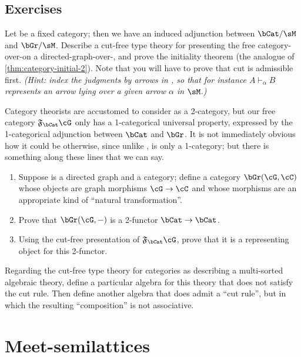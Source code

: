 \documentclass{book}
\let\types\vdash
\newcommand{\F}[1]{\mathfrak{F}_{#1}}
\begin{document}
\subsection*{Exercises}

\begin{ex}\label{ex:categories-over}
  Let \sM be a fixed category; then we have an induced adjunction between $\bCat/\sM$ and $\bGr/\sM$.
  Describe a cut-free type theory for presenting the free category-over-\sM on a directed-graph-over-\sM, and prove the initiality theorem (the analogue of \cref{thm:category-initial-2}).
  Note that you will have to prove that cut is admissible first.
  \textit{(Hint: index the judgments by arrows in \sM, so that for instance $A\types_\alpha B$ represents an arrow lying over a given arrow $\alpha$ in $\sM$.)}
\end{ex}

\begin{ex}\label{ex:cat-2free}
  Category theorists are accustomed to consider \bCat as a 2-category, but our free category $\F\bCat\cG$ only has a 1-categorical universal property, expressed by the 1-categorical adjunction between $\bCat$ and $\bGr$.
  It is not immediately obvious how it could be otherwise, since unlike \bCat, \bGr is only a 1-category; but there is something along these lines that we can say.
  \begin{enumerate}
  \item Suppose \cG is a directed graph and \cC a category; define a category $\bGr(\cG,\cC)$ whose objects are graph morphisms $\cG\to\cC$ and whose morphisms are an appropriate kind of ``natural transformation''.
  \item Prove that $\bGr(\cG,-)$ is a 2-functor $\bCat\to\bCat$.
  \item Using the cut-free presentation of $\F\bCat\cG$, prove that it is a representing object for this 2-functor.
  \end{enumerate}
\end{ex}

\begin{ex}\label{ex:nonfree-noadm}
  Regarding the cut-free type theory for categories as describing a multi-sorted algebraic theory, define a particular algebra for this theory that does not satisfy the cut rule.
  Then define another algebra that does admit a ``cut rule'', but in which the resulting ``composition'' is not associative.
\end{ex}


\section{Meet-semilattices}
\label{sec:mslat}
\end{document}
